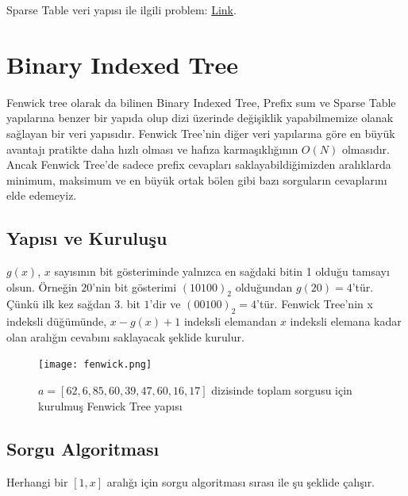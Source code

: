 \documentclass[12pt]{article}
\begin{document}
    Sparse Table veri yap{\i}s{\i} ile ilgili problem: \href{https://www.spoj.com/problems/RMQSQ/}{Link}.

    \cleardoublepage
	
	\section{Binary Indexed Tree}
	
	Fenwick tree olarak da bilinen Binary Indexed Tree, Prefix sum ve Sparse Table yap{\i}lar{\i}na benzer bir yap{\i}da olup dizi \"{u}zerinde de\u{g}i\c{s}iklik yapabilmemize olanak sa\u{g}layan bir veri yap{\i}s{\i}d{\i}r. Fenwick Tree'nin di\u{g}er veri yap{\i}lar{\i}na g\"{o}re en b\"{u}y\"{u}k avantaj{\i} pratikte daha h{\i}zl{\i} olmas{\i} ve haf{\i}za karma\c{s}{\i}kl{\i}\u{g}{\i}n{\i}n $O(N)$ olmas{\i}d{\i}r. Ancak Fenwick Tree'de sadece prefix cevaplar{\i} saklayabildi\u{g}imizden aral{\i}klarda minimum, maksimum ve en b\"{u}y\"{u}k ortak b\"{o}len gibi baz{\i} sorgular{\i}n cevaplar{\i}n{\i} elde edemeyiz.
	
	\subsection{Yap{\i}s{\i} ve Kurulu\c{s}u}
	
	$g(x)$, $x$ say{\i}s{\i}n{\i}n bit g\"{o}steriminde yaln{\i}zca en sa\u{g}daki bitin 1 oldu\u{g}u tamsay{\i} olsun. \"{O}rne\u{g}in $20$'nin bit g\"{o}sterimi $(10100)_2$ oldu\u{g}undan $g(20)=4$'t\"{u}r. \c{C}\"{u}nk\"{u} ilk kez sa\u{g}dan $3.$ bit $1$'dir ve $(00100)_2=4$'t\"{u}r.  Fenwick Tree'nin x indeksli d\"{u}\u{g}\"{u}m\"{u}nde, $x -g(x)+1$ indeksli elemandan $x$ indeksli elemana kadar olan aral{\i}\u{g}{\i}n cevab{\i}n{\i} saklayacak \c{s}eklide kurulur.
	
	\begin{figure}[h]
		\centering
		\texttt{[image: fenwick.png]}
		\label{fig:fenwick}
        \caption{$a = [62,6,85,60,39,47,60,16,17]$ dizisinde toplam sorgusu i\c{c}in kurulmu\c{s} Fenwick Tree yap{\i}s{\i}}
	\end{figure}
	
	\clearpage

    \subsection{Sorgu Algoritmas{\i}}
    
    Herhangi bir $[1,x]$ aral{\i}\u{g}{\i} i\c{c}in sorgu algoritmas{\i} s{\i}ras{\i} ile \c{s}u \c{s}eklide \c{c}al{\i}\c{s}{\i}r.
    
\end{document}
